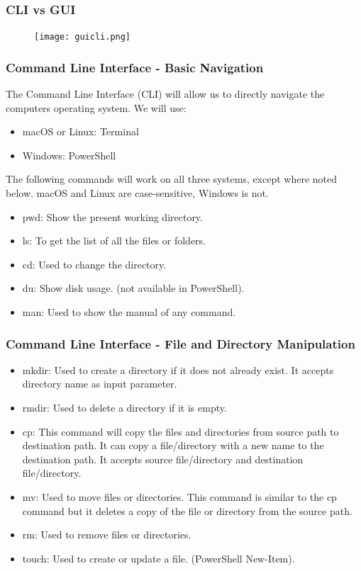\documentclass{beamer}
\begin{document}
\begin{frame}\frametitle{CLI vs GUI}
\begin{figure}[h]
	\texttt{[image: guicli.png]}
\end{figure}
\end{frame}


\begin{frame}\frametitle{Command Line Interface - Basic Navigation}
\label{commandlineinterface}

The Command Line Interface (CLI) will allow us to directly navigate the computers operating system. We will use:
\begin{itemize}
\item macOS or Linux: Terminal
\item Windows: PowerShell
\end{itemize}

The following commands will work on all three systems, except where noted below. macOS and Linux are case-sensitive, Windows is not.

\begin{itemize}
\item pwd: Show the present working directory.
\item ls: To get the list of all the files or folders.
\item cd: Used to change the directory.
\item du: Show disk usage. (not available in PowerShell).
\item man: Used to show the manual of any command.
\end{itemize}
\end{frame}

\begin{frame}\frametitle{Command Line Interface - File and Directory Manipulation}

\begin{itemize}
\item mkdir: Used to create a directory if it does not already exist. It accepts directory name as input parameter.
\item rmdir: Used to delete a directory if it is empty.
\item cp: This command will copy the files and directories from source path to destination path. It can copy a file/directory with a new name to the destination path. It accepts source file/directory and destination file/directory.
\item mv: Used to move files or directories. This command is similar to the cp command but it deletes a copy of the file or directory from the source path.
\item rm: Used to remove files or directories.
\item touch: Used to create or update a file. (PowerShell New-Item).
\end{itemize}
\end{frame}
\end{document}
